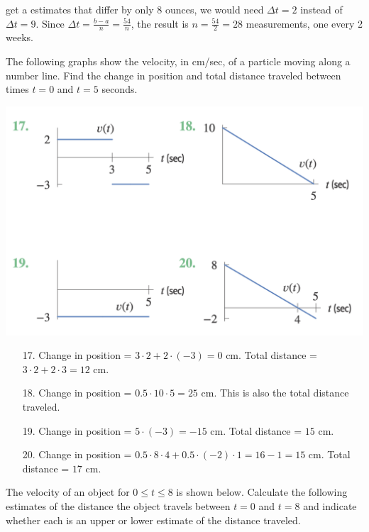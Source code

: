 \documentclass[11pt]{exam}
\begin{document}
\begin{questions}
\begin{solution}
\begin{enumerate}[(a)]
    get a estimates that differ by only \(8\) ounces, we would need
    \(\Delta t=2\) instead of \(\Delta t =9\). Since \(\Delta t =
    \frac{b-a}{n} = \frac{54}{n}\), the result is \(n = \frac{54}{2} =
    28\) measurements, one every 2 weeks.
  \end{enumerate}
\end{solution}
\question The following graphs show the velocity, in cm/sec, of a
  particle moving along a number line. Find the change in position and
  total distance traveled between times \(t=0\) and \(t=5\) seconds.
  \begin{center}
    \includegraphics[scale=0.4]{Figures/graphs.png}
  \end{center}
  \begin{solution}
    \begin{enumerate}
    \item[17.] Change in position = \(3\cdot 2 + 2 \cdot(-3) =
      0\) cm. Total distance = \(3 \cdot 2 + 2 \cdot 3 = 12\) cm.
    \item[18.] Change in position = \(0.5 \cdot 10 \cdot 5 = 25\)
      cm. This is also the total distance traveled.
    \item[19.] Change in position = \(5 \cdot (-3) = -15\) cm. Total
      distance = \(15\) cm.
    \item[20.] Change in position = \(0.5 \cdot 8 \cdot 4 + 0.5 \cdot
      (-2) \cdot 1 = 16-1 = 15\) cm. Total distance = \(17\) cm.
    \end{enumerate}
  \end{solution}
\question The velocity of an object for \(0 \leq t \leq 8\) is shown
  below. Calculate the following estimates of the distance the object
  travels between \(t=0\) and \(t=8\) and indicate whether each is an
  upper or lower estimate of the distance traveled. 
  \begin{parts}

\end{parts}
\end{questions}
\end{document}
